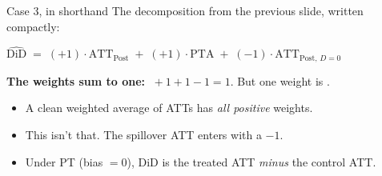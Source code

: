 \documentclass[aspectratio=169,11pt]{beamer}
\begin{document}
\begin{frame}{Case 3, in shorthand}
\footnotesize
The decomposition from the previous slide, written compactly:

\vspace{0.6em}
\begin{center}
\Large
$\widehat{\text{DiD}} \;=\; (+1)\cdot \text{ATT}_{\text{Post}} \;+\; (+1)\cdot\text{PTA} \;+\; (-1)\cdot\text{ATT}_{\text{Post},\,D=0}$
\end{center}

\vspace{0.6em}
\textbf{The weights sum to one:} $\;+1 + 1 - 1 = 1$. \;But one weight is .

\vspace{0.6em}
\begin{itemize}\setlength\itemsep{2pt}
  \item A clean weighted average of ATTs has \textit{all positive} weights.
  \item This isn't that. \;The spillover ATT enters with a $-1$.
  \item Under PT (bias $=0$), DiD is the treated ATT \textit{minus} the control ATT.
\end{itemize}

\vspace{0.3em}
\end{frame}
\end{document}
